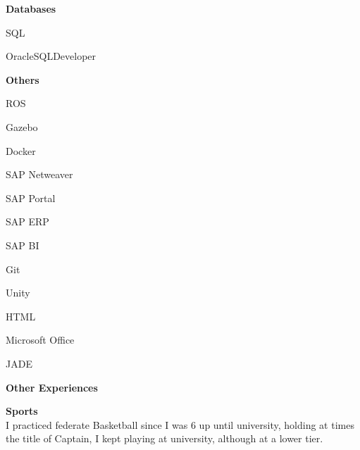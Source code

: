 \documentclass[a4paper,12pt,final]{memoir}
\newcommand{\Sep}{\vspace{1.5em}}
\newcommand{\SmallSep}{\vspace{0.5em}}
\newcommand{\CVSection}[1]
	{\Large\textbf{#1}\par
	\SmallSep\normalsize\normalfont}
\newcommand{\CVItem}[1]
	{\textbf{\color{RoyalBlue} #1}}
\begin{document}
\CVItem{Databases}
\begin{multicols}{3}
\begin{compactitem}[\color{RoyalBlue}$\circ$]
	\item SQL 
	\item OracleSQLDeveloper
\end{compactitem}
\end{multicols}
\SmallSep

\CVItem{Others}
\begin{multicols}{3}
\begin{compactitem}[\color{RoyalBlue}$\circ$]
    \item ROS
    \item Gazebo
    \item Docker
    \item SAP Netweaver 
	\item SAP Portal 
	\item SAP ERP
	\item SAP BI
	\item Git
	\item Unity
	\item HTML 
	\item Microsoft Office
    \item JADE
\end{compactitem}
\end{multicols}

\SmallSep

\Sep

\CVSection{Other Experiences}
\CVItem{Sports}\\
I practiced federate Basketball since I was 6 up until university, holding at
times the title of Captain, I kept playing at university, although at a lower
tier.

\end{document}
